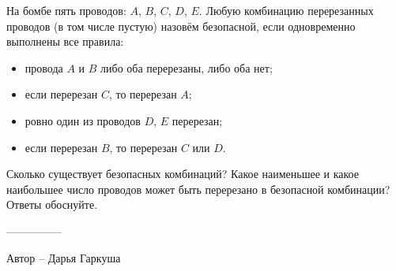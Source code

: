 \question
На бомбе пять проводов: $A$, $B$, $C$, $D$, $E$. Любую комбинацию перерезанных проводов (в том числе пустую) назовём безопасной, если одновременно выполнены все правила:
\begin{itemize}
    \item провода $A$ и $B$ либо оба перерезаны, либо оба нет;
    \item если перерезан $C$, то перерезан $A$;
    \item ровно один из проводов $D$, $E$ перерезан;
    \item если перерезан $B$, то перерезан $C$ или $D$.
\end{itemize}
Сколько существует безопасных комбинаций? Какое наименьшее и какое наибольшее число проводов может быть перерезано в безопасной комбинации? Ответы обоснуйте.

---------------

Автор -- Дарья Гаркуша